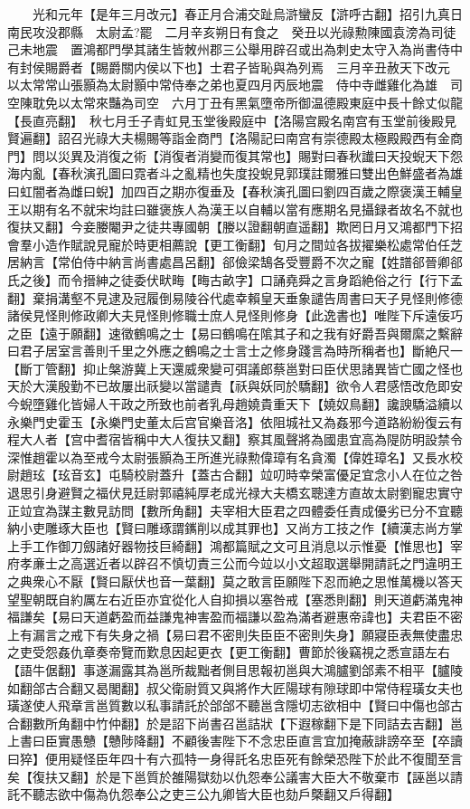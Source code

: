 　　光和元年【是年三月改元】春正月合浦交趾烏滸蠻反【滸呼古翻】招引九真日南民攻没郡縣　太尉孟?罷　二月辛亥朔日有食之　癸丑以光祿勲陳國袁滂為司徒　己未地震　置鴻都門學其諸生皆敇州郡三公舉用辟召或出為刺史太守入為尚書侍中有封侯賜爵者【賜爵關内侯以下也】士君子皆恥與為列焉　三月辛丑赦天下改元　以太常常山張顥為太尉顥中常侍奉之弟也夏四月丙辰地震　侍中寺雌雞化為雄　司空陳耽免以太常來豔為司空　六月丁丑有黑氣墮帝所御温德殿東庭中長十餘丈似龍【長直亮翻】　秋七月壬子青虹見玉堂後殿庭中【洛陽宫殿名南宫有玉堂前後殿見賢遍翻】詔召光祿大夫楊賜等詣金商門【洛陽記曰南宫有崇德殿太極殿殿西有金商門】問以災異及消復之術【消復者消變而復其常也】賜對曰春秋䜟曰天投蜺天下怨海内亂【春秋演孔圖曰霓者斗之亂精也失度投蜺見郭璞註爾雅曰雙出色鮮盛者為雄曰虹闇者為雌曰蜺】加四百之期亦復垂及【春秋演孔圖曰劉四百歲之際褒漢王輔皇王以期有名不就宋均註曰雖褒族人為漢王以自輔以當有應期名見攝録者故名不就也復扶又翻】今妾媵閹尹之徒共專國朝【媵以證翻朝直遥翻】欺罔日月又鴻都門下招會羣小造作賦說見寵於時更相薦說【更工衡翻】旬月之間竝各拔擢樂松處常伯任芝居納言【常伯侍中納言尚書處昌呂翻】郤儉梁鵠各受豐爵不次之寵【姓譜郤晉卿郤氏之後】而令搢紳之徒委伏畎畮【畮古畝字】口誦堯舜之言身蹈絶俗之行【行下孟翻】棄捐溝壑不見逮及冠履倒易陵谷代處幸賴皇天垂象譴告周書曰天子見怪則修德諸侯見怪則修政卿大夫見怪則修職士庶人見怪則修身【此逸書也】唯陛下斥遠佞巧之臣【遠于願翻】速徵鶴鳴之士【易曰鶴鳴在隂其子和之我有好爵吾與爾縻之繫辭曰君子居室言善則千里之外應之鶴鳴之士言士之修身踐言為時所稱者也】斷絶尺一【斷丁管翻】抑止槃游冀上天還威衆變可弭議郎蔡邕對曰臣伏思諸異皆亡國之怪也天於大漢殷勤不已故屢出祅變以當譴責【祅與妖同於驕翻】欲令人君感悟改危即安今蜺墮雞化皆婦人干政之所致也前者乳母趙嬈貴重天下【嬈奴鳥翻】讒諛驕溢續以永樂門史霍玉【永樂門史董太后宫官樂音洛】依阻城社又為姦邪今道路紛紛復云有程大人者【宫中耆宿皆稱中大人復扶又翻】察其風聲將為國患宜高為隄防明設禁令深惟趙霍以為至戒今太尉張顥為王所進光祿勲偉璋有名貪濁【偉姓璋名】又長水校尉趙玹【玹音玄】屯騎校尉蓋升【蓋古合翻】竝叨時幸榮富優足宜念小人在位之咎退思引身避賢之福伏見廷尉郭禧純厚老成光禄大夫橋玄聰達方直故太尉劉寵忠實守正竝宜為謀主數見訪問【數所角翻】夫宰相大臣君之四體委任責成優劣已分不宜聽納小吏雕琢大臣也【賢曰雕琢謂䥴削以成其罪也】又尚方工技之作【續漢志尚方掌上手工作御刀劔諸好器物技巨綺翻】鴻都篇賦之文可且消息以示惟憂【惟思也】宰府孝亷士之高選近者以辟召不慎切責三公而今竝以小文超取選舉開請託之門違明王之典衆心不厭【賢曰厭伏也音一葉翻】莫之敢言臣願陛下忍而絶之思惟萬機以答天望聖朝既自約厲左右近臣亦宜從化人自抑損以塞咎戒【塞悉則翻】則天道虧滿鬼神福謙矣【易曰天道虧盈而益謙鬼神害盈而福謙以盈為滿者避惠帝諱也】夫君臣不密上有漏言之戒下有失身之禍【易曰君不密則失臣臣不密則失身】願寢臣表無使盡忠之吏受怨姦仇章奏帝覽而歎息因起更衣【更工衡翻】曹節於後竊視之悉宣語左右【語牛倨翻】事遂漏露其為邕所裁黜者側目思報初邕與大鴻臚劉郃素不相平【臚陵如翻郃古合翻又曷閣翻】叔父衛尉質又與將作大匠陽球有隙球即中常侍程璜女夫也璜遂使人飛章言邕質數以私事請託於郃郃不聽邕含隱切志欲相中【賢曰中傷也郃古合翻數所角翻中竹仲翻】於是詔下尚書召邕詰狀【下遐稼翻下是下同詰去吉翻】邕上書曰臣實愚戇【戇陟降翻】不顧後害陛下不念忠臣直言宜加掩蔽誹謗卒至【卒讀曰猝】便用疑怪臣年四十有六孤特一身得託名忠臣死有餘榮恐陛下於此不復聞至言矣【復扶又翻】於是下邕質於雒陽獄劾以仇怨奉公議害大臣大不敬棄市【誣邕以請託不聽志欲中傷為仇怨奉公之吏三公九卿皆大臣也劾戶槩翻又戶得翻】